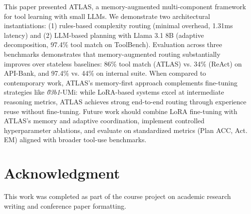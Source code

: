 \documentclass[conference]{IEEEtran}
\begin{document}
This paper presented ATLAS, a memory-augmented multi-component framework for tool learning with small LLMs. We demonstrate two architectural instantiations: (1) rules-based complexity routing (minimal overhead, 1.31ms latency) and (2) LLM-based planning with Llama 3.1 8B (adaptive decomposition, 97.4\% tool match on ToolBench). Evaluation across three benchmarks demonstrates that memory-augmented routing substantially improves over stateless baselines: 86\% tool match (ATLAS) vs. 34\% (ReAct) on API-Bank, and 97.4\% vs. 44\% on internal suite. When compared to contemporary work, ATLAS's memory-first approach complements fine-tuning strategies like \textit{\u03b1}-UMi: while LoRA-based systems excel at intermediate reasoning metrics, ATLAS achieves strong end-to-end routing through experience reuse without fine-tuning. Future work should combine LoRA fine-tuning with ATLAS's memory and adaptive coordination, implement controlled hyperparameter ablations, and evaluate on standardized metrics (Plan ACC, Act. EM) aligned with broader tool-use benchmarks.
\section*{Acknowledgment}
This work was completed as part of the course project on academic research writing and conference paper formatting.



\end{document}
